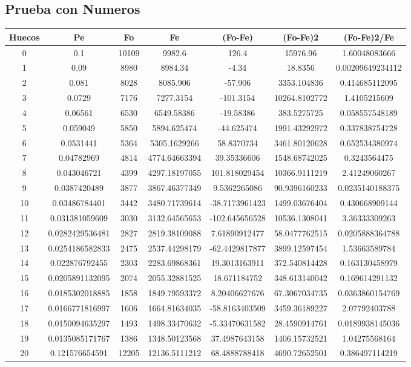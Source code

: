\documentclass{article}
\begin{document}
\subsection{Prueba con Numeros}
\begin{tabular}{|c|c|c|c|c|c|c|}
Huecos&Pe&Fo&Fe&(Fo{-}Fe)&(Fo{-}Fe)2&(Fo{-}Fe)2/Fe\\
\hline
0&0.1&10109&9982.6&126.4&15976.96&1.60048083666\\
\hline
1&0.09&8980&8984.34&{-}4.34&18.8356&0.00209649234112\\
\hline
2&0.081&8028&8085.906&{-}57.906&3353.104836&0.414685112095\\
\hline
3&0.0729&7176&7277.3154&{-}101.3154&10264.8102772&1.4105215609\\
\hline
4&0.06561&6530&6549.58386&{-}19.58386&383.5275725&0.058557548189\\
\hline
5&0.059049&5850&5894.625474&{-}44.625474&1991.43292972&0.337838754728\\
\hline
6&0.0531441&5364&5305.1629266&58.8370734&3461.80120628&0.652534380974\\
\hline
7&0.04782969&4814&4774.64663394&39.35336606&1548.68742025&0.3243564475\\
\hline
8&0.043046721&4399&4297.18197055&101.818029454&10366.9111219&2.41249060267\\
\hline
9&0.0387420489&3877&3867.46377349&9.5362265086&90.9396160233&0.0235140188375\\
\hline
10&0.03486784401&3442&3480.71739614&{-}38.7173961423&1499.03676404&0.430668909144\\
\hline
11&0.031381059609&3030&3132.64565653&{-}102.645656528&10536.1308041&3.36333309263\\
\hline
12&0.0282429536481&2827&2819.38109088&7.61890912477&58.0477762515&0.0205888364788\\
\hline
13&0.0254186582833&2475&2537.44298179&{-}62.4429817877&3899.12597454&1.53663589784\\
\hline
14&0.022876792455&2303&2283.69868361&19.3013163911&372.540814428&0.163130458979\\
\hline
15&0.0205891132095&2074&2055.32881525&18.671184752&348.613140042&0.169614291132\\
\hline
16&0.0185302018885&1858&1849.79593372&8.20406627676&67.3067034735&0.0363860154769\\
\hline
17&0.0166771816997&1606&1664.81634035&{-}58.8163403509&3459.36189227&2.07792403788\\
\hline
18&0.0150094635297&1493&1498.33470632&{-}5.33470631582&28.4590914761&0.0189938145036\\
\hline
19&0.0135085171767&1386&1348.50123568&37.4987643158&1406.15732521&1.04275568164\\
\hline
20&0.121576654591&12205&12136.5111212&68.4888788418&4690.72652501&0.386497114219\\
\end{tabular}
\end{document}
